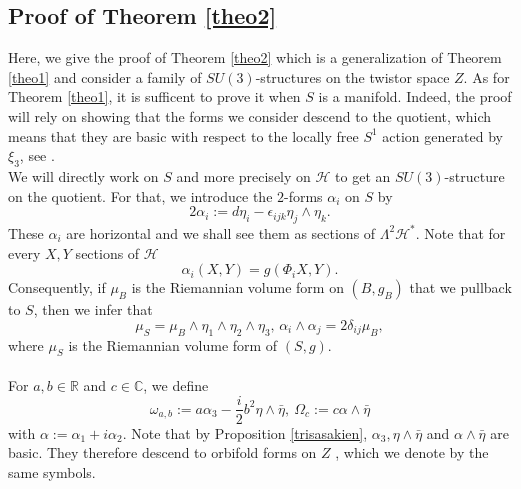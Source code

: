 \documentclass[12pt, reqno]{amsart}
\theoremstyle{definition}
\newcommand{\R}{\mathbb{R}}
\newcommand{\C}{\mathbb{C}}
\newcommand{\cH}{\mathcal{H}}
\begin{document}
\subsection{Proof of Theorem \ref{theo2}}\label{3.5}
Here, we give the proof of Theorem \ref{theo2} which is a generalization of Theorem \ref{theo1} and consider a family of $SU(3)$-structures on the twistor space $Z$. As for Theorem \ref{theo1}, it is sufficent to prove it when $S$ is a manifold. Indeed, the proof will rely on showing that the forms we consider descend to the quotient, which means that they are basic with respect to the locally free $S^1$ action generated by $\xi_3$, see \cite[\S3.5]{caramello2022introductionorbifolds}.\\ \indent   We will directly work on $S$ and more precisely on $\cH$ to get an $SU(3)$-structure on the quotient. For that, we introduce the $2$-forms $\alpha_i$ on $S$ by $$2\alpha_i:=d\eta_i-\epsilon_{ijk}\eta_j\wedge\eta_k.$$ These $\alpha_i$ are horizontal and we shall see them as sections of $\Lambda^2\cH^*$. Note that for every $X,Y$ sections of $\cH$ $$\alpha_i(X,Y)=g(\Phi_iX,Y).$$ Consequently, if $\mu_B$ is the Riemannian volume form on $(B,g_B)$ that we pullback to $S$, then  we infer that $$\mu_S=\mu_B\wedge\eta_1\wedge\eta_2\wedge\eta_3, \,\alpha_i\wedge\alpha_j=2\delta_{ij}\mu_B,$$ where $\mu_S$ is the Riemannian volume form of $(S,g)$. \\ \\
For $a,b\in\R$ and $c\in\C$, we define $$\omega_{a,b}:=a\alpha_3-\frac{i}{2}b^2\eta\wedge\bar\eta,~ \Omega_c:=c\alpha\wedge\bar\eta$$ with $\alpha:=\alpha_1+i\alpha_2$. Note that by Proposition \ref{trisasakien}, $\alpha_3, \eta\wedge\bar\eta$ and $\alpha\wedge\bar\eta$ are basic. They therefore descend to orbifold forms on $Z$ \cite[\S3.5]{caramello2022introductionorbifolds}, which we denote by the same symbols. 
\end{document}
